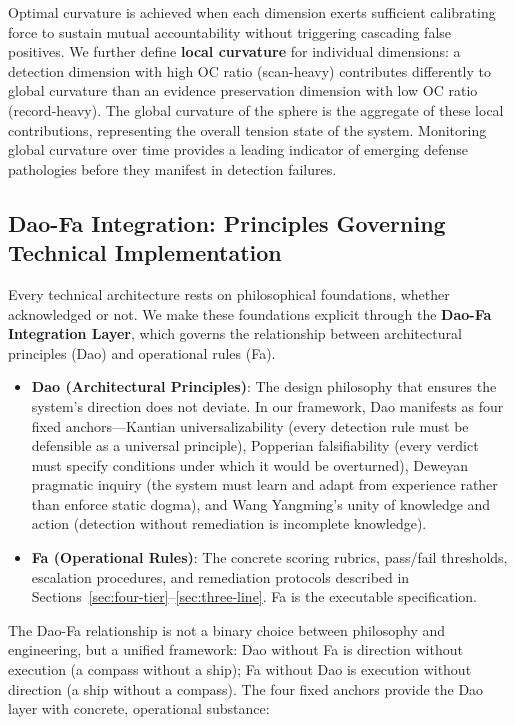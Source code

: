 \documentclass[11pt]{article}
\begin{document}
Optimal curvature is achieved when each dimension exerts sufficient calibrating 
force to sustain mutual accountability without triggering cascading false positives. 
We further define \textbf{local curvature} for individual dimensions: a detection 
dimension with high OC ratio (scan-heavy) contributes differently to global curvature 
than an evidence preservation dimension with low OC ratio (record-heavy). The global 
curvature of the sphere is the aggregate of these local contributions, representing 
the overall tension state of the system. Monitoring global curvature over time 
provides a leading indicator of emerging defense pathologies before they manifest in 
detection failures.

\subsection{Dao-Fa Integration: Principles Governing Technical Implementation}

Every technical architecture rests on philosophical foundations, whether acknowledged 
or not. We make these foundations explicit through the \textbf{Dao-Fa Integration Layer}, 
which governs the relationship between architectural principles (Dao) and operational 
rules (Fa).

\begin{itemize}
  \item \textbf{Dao (Architectural Principles)}: The design philosophy that ensures the 
    system's direction does not deviate. In our framework, Dao manifests as four 
    fixed anchors---Kantian universalizability (every detection rule must be 
    defensible as a universal principle), Popperian falsifiability (every verdict 
    must specify conditions under which it would be overturned), Deweyan pragmatic 
    inquiry (the system must learn and adapt from experience rather than enforce 
    static dogma), and Wang Yangming's unity of knowledge and action (detection 
    without remediation is incomplete knowledge).
  \item \textbf{Fa (Operational Rules)}: The concrete scoring rubrics, pass/fail 
    thresholds, escalation procedures, and remediation protocols described in 
    Sections~\ref{sec:four-tier}--\ref{sec:three-line}. Fa is the executable 
    specification.
\end{itemize}

The Dao-Fa relationship is not a binary choice between philosophy and engineering, 
but a unified framework: Dao without Fa is direction without execution (a compass 
without a ship); Fa without Dao is execution without direction (a ship without a 
compass). The four fixed anchors provide the Dao layer with concrete, operational 
substance:
\end{document}
